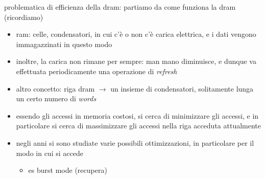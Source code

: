 problematica di efficienza della dram: partiamo da come funziona la dram (ricordiamo)

\begin{itemize}
  \item ram: celle, condensatori, in cui c'\`e o non c'\`e carica elettrica, e i dati vengono immagazzinati in questo modo
  \item inoltre, la carica non rimane per sempre: man mano diminuisce, e dunque va effettuata periodicamente una operazione di \textit{refresh}
  \item altro concetto: riga dram $\rightarrow$ un insieme di condensatori, solitamente lunga un certo numero di \textit{words}
  \item essendo gli accessi in memoria costosi, si cerca di minimizzare gli accessi, e in particolare si cerca di massimizzare gli accessi nella riga acceduta attualmente
  \item negli anni si sono studiate varie possibili ottimizzazioni, in particolare per il modo in cui si accede
    \begin{itemize}
      \item es burst mode (recupera)
    \end{itemize}


\end{itemize}
